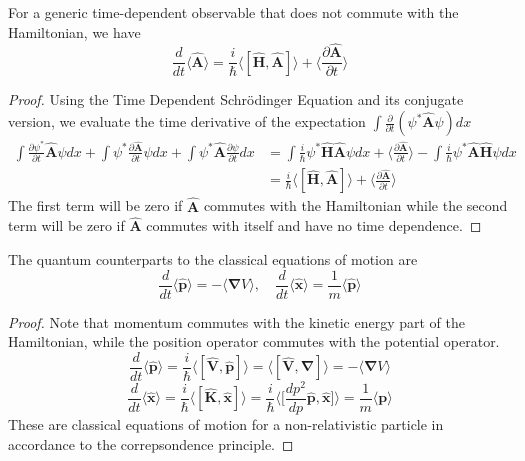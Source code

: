 \documentclass[a4paper]{article}
\begin{document}
\begin{thm}
For a generic time-dependent observable that does not commute with the Hamiltonian, we have
$$\frac{d}{dt}\big\langle\mathbf{\hat{A}}\big\rangle=\frac{i}{\hbar}\big\langle[\mathbf{\hat{H}},\mathbf{\hat{A}}]\big\rangle+\bigg\langle\frac{\partial\mathbf{\hat{A}}}{\partial t}\bigg\rangle$$
\end{thm}
\begin{proof}
Using the Time Dependent Schr\"{o}dinger Equation and its conjugate version, we evaluate the time derivative of the expectation $\int\frac{\partial}{\partial t}(\psi^*\mathbf{\hat{A}}\psi)dx$
\begin{align}
\int\frac{\partial\psi^*}{\partial t}\mathbf{\hat{A}}\psi dx+\int\psi^*\frac{\partial\mathbf{\hat{A}}}{\partial t}\psi dx+\int\psi^*\mathbf{\hat{A}}\frac{\partial\psi}{\partial t}dx&=\int\frac{i}{\hbar}\psi^*\mathbf{\hat{H}}\mathbf{\hat{A}}\psi dx+\bigg\langle\frac{\partial\mathbf{\hat{A}}}{\partial t}\bigg\rangle-\int\frac{i}{\hbar}\psi^*\mathbf{\hat{A}}\mathbf{\hat{H}}\psi dx\nonumber\\&=\frac{i}{\hbar}\big\langle[\mathbf{\hat{H}},\mathbf{\hat{A}}]\big\rangle+\bigg\langle\frac{\partial\mathbf{\hat{A}}}{\partial t}\bigg\rangle\nonumber
\end{align}
The first term will be zero if $\mathbf{\hat{A}}$ commutes with the Hamiltonian while the second term will be zero if $\mathbf{\hat{A}}$ commutes with itself and have no time dependence. 
\end{proof}
\begin{cor}
The quantum counterparts to the classical equations of motion are
$$\frac{d}{dt}\langle\mathbf{\hat{p}}\rangle=-\langle\boldsymbol{\nabla}V\rangle,\quad\frac{d}{dt}\langle\mathbf{\hat{x}}\rangle=\frac{1}{m}\langle\mathbf{\hat{p}}\rangle$$
\end{cor}
\begin{proof}
Note that momentum commutes with the kinetic energy part of the Hamiltonian, while the position operator commutes with the potential operator.
$$\frac{d}{dt}\big\langle\mathbf{\hat{p}}\big\rangle=\frac{i}{\hbar}\big\langle[\mathbf{\hat{V}},\mathbf{\hat{p}}]\big\rangle=\big\langle[\mathbf{\hat{V}},\boldsymbol{\nabla}]\big\rangle=-\big\langle\boldsymbol{\nabla}V\big\rangle$$
$$\frac{d}{dt}\big\langle\mathbf{\hat{x}}\big\rangle=\frac{i}{\hbar}\big\langle[\mathbf{\hat{K}},\mathbf{\hat{x}}]\big\rangle=\frac{i}{\hbar}\bigg\langle\bigg[\frac{dp^2}{dp}\mathbf{\hat{p}},\mathbf{\hat{x}}\bigg]\bigg\rangle=\frac{1}{m}\big\langle\mathbf{p}\big\rangle$$
These are classical equations of motion for a non-relativistic particle in accordance to the correpsondence principle.
\end{proof}
\end{document}
